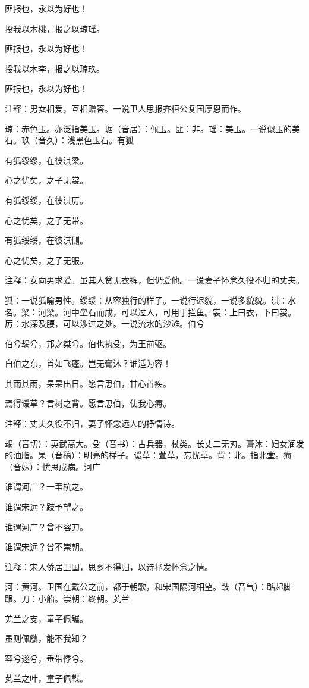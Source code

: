 \documentclass[12pt,UTF8]{ctexbook}
\begin{document}
匪报也，永以为好也！

投我以木桃，报之以琼瑶。

匪报也，永以为好也！

投我以木李，报之以琼玖。

匪报也，永以为好也！

注释：男女相爱，互相赠答。一说卫人思报齐桓公复国厚恩而作。

琼：赤色玉。亦泛指美玉。琚（音居）：佩玉。匪：非。瑶：美玉。一说似玉的美石。玖（音久）：浅黑色玉石。有狐

有狐绥绥，在彼淇梁。

心之忧矣，之子无裳。

有狐绥绥，在彼淇厉。

心之忧矣，之子无带。

有狐绥绥，在彼淇侧。

心之忧矣，之子无服。

注释：女向男求爱。虽其人贫无衣裤，但仍爱他。一说妻子怀念久役不归的丈夫。

狐：一说狐喻男性。绥绥：从容独行的样子。一说行迟貌，一说多貌貌。淇：水名。梁：河梁。河中垒石而成，可以过人，可用于拦鱼。裳：上曰衣，下曰裳。厉：水深及腰，可以涉过之处。一说流水的沙滩。伯兮

伯兮朅兮，邦之桀兮。伯也执殳，为王前驱。

自伯之东，首如飞蓬。岂无膏沐？谁适为容！

其雨其雨，杲杲出日。愿言思伯，甘心首疾。

焉得谖草？言树之背。愿言思伯，使我心痗。

注释：丈夫久役不归，妻子怀念远人的抒情诗。

朅（音切）：英武高大。殳（音书）：古兵器，杖类。长丈二无刃。膏沐：妇女润发的油脂。杲（音稿）：明亮的样子。谖草：萱草，忘忧草。背：北。指北堂。痗（音妹）：忧思成病。河广

谁谓河广？一苇杭之。

谁谓宋远？跂予望之。

谁谓河广？曾不容刀。

谁谓宋远？曾不崇朝。

注释：宋人侨居卫国，思乡不得归，以诗抒发怀念之情。

河：黄河。卫国在戴公之前，都于朝歌，和宋国隔河相望。跂（音气）：踮起脚跟。刀：小船。崇朝：终朝。芄兰

芄兰之支，童子佩觿。

虽则佩觿，能不我知？

容兮遂兮，垂带悸兮。

芄兰之叶，童子佩韘。
\end{document}
